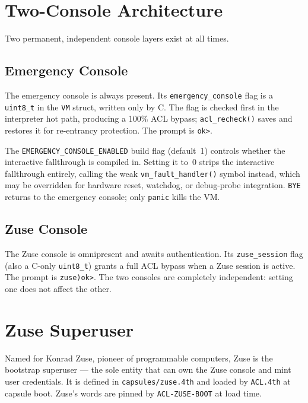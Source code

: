 \section{Two-Console Architecture}
\label{vol2:sec:acl:consoles}


Two permanent, independent console layers exist at all times.

\subsection{Emergency Console}

The emergency console is always present. Its \texttt{emergency\_console}
flag is a \texttt{uint8\_t} in the \texttt{VM} struct, written only by C.
The flag is checked first in the interpreter hot path, producing a 100\%
ACL bypass; \texttt{acl\_recheck()} saves and restores it for re-entrancy
protection. The prompt is \texttt{ok>}.

The \texttt{EMERGENCY\_CONSOLE\_ENABLED} build flag (default~1) controls
whether the interactive fallthrough is compiled in. Setting it to~0 strips
the interactive fallthrough entirely, calling the weak
\texttt{vm\_fault\_handler()} symbol instead, which may be overridden for
hardware reset, watchdog, or debug-probe integration. \texttt{BYE} returns
to the emergency console; only \texttt{panic} kills the VM.

\subsection{Zuse Console}

The Zuse console is omnipresent and awaits authentication. Its
\texttt{zuse\_session} flag (also a C-only \texttt{uint8\_t}) grants a full
ACL bypass when a Zuse session is active. The prompt is \texttt{zuse)ok>}.
The two consoles are completely independent: setting one does not affect
the other.

\section{Zuse Superuser}
\label{vol2:sec:acl:zuse}


Named for Konrad Zuse, pioneer of programmable computers, Zuse is the
bootstrap superuser --- the sole entity that can own the Zuse console and
mint user credentials. It is defined in \texttt{capsules/zuse.4th} and
loaded by \texttt{ACL.4th} at capsule boot. Zuse's words are pinned by
\texttt{ACL-ZUSE-BOOT} at load time.

